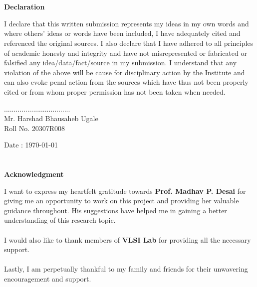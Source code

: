 \documentclass[12pt]{report}
\begin{document}
\chapter*{}
\begin{center}
{\Large \textbf{Declaration}}
\end{center}
\bigskip
\bigskip
\bigskip
I declare that this written submission represents my ideas in my own words and where
others' ideas or words have been included, I have adequately cited and referenced the original
sources.  I also declare that I have adhered to all principles of academic honesty and integrity
and   have   not   misrepresented   or   fabricated   or   falsified   any   idea/data/fact/source   in   my
submission.  I understand that any violation of the above will be cause for disciplinary action
by the Institute and can also evoke  penal action from the sources which have thus not been
properly cited or from whom proper permission has not been taken when needed.\\
\bigskip
\bigskip
\bigskip
\begin{flushleft}
..................................\\
{Mr. Harshad Bhausaheb Ugale\\
Roll No. 20307R008}
\end{flushleft}

\begin{flushleft}
{Date : \today}
\end{flushleft}

\newpage

\chapter*{}
\begin{center}
{\Large \textbf{Acknowledgment}}
\end{center}
I want to express my heartfelt gratitude towards \textbf{Prof. Madhav P. Desai} for giving me an opportunity to work on this project and providing her valuable guidance throughout. His suggestions have helped me in gaining a better understanding of this research topic.\\\\
I would also like to thank members of \textbf{VLSI Lab} for providing all the necessary support.\\\\
Lastly, I am perpetually thankful to my family and friends for their unwavering encouragement and support.
\end{document}
